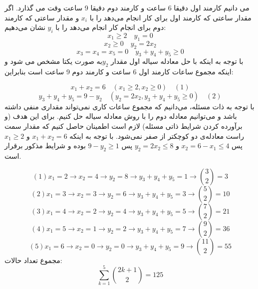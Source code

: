 \documentclass[12pt,onecolumn,a4paper]{article}
\begin{document}
می دانیم کارمند اول دقیقا 6 ساعت و کارمند دوم دقیقا 9 ساعت وقت می گذارد.
اگر مقدار ساعتی که کارمند اول برای کار  انجام می‌دهد را با $x_i$ و مقدار ساعتی که کارمند دوم برای انجام کار   انجام می‌دهد را با $y_i$  نشان می‌دهیم:
$$ x_1 \geq 2 \quad y_1 = 0 $$
$$ x_2 \geq 0 \quad y_2 = 2x_2 $$
$$ x_3=x_4=x_5=0 \quad y_3  + y_4 + y_5 \geq 0 $$
با توجه به اینکه با حل معادله سیاله اول مقدار $y_2$به صورت یکتا مشخص می شود و اینکه مجموع ساعات کارمند اول 6 ساعت و کارمند دوم 9 ساعت است بنابراین:

$$x_1 +x_2 = 6 \quad (x_1 \geq 2 , x_2 \geq  0)     \quad (1)$$
$$y_3 + y_4 + y_5 = 9-y_2 \quad (y_2 = 2x_2 , y_3 + y_4 + y_5  \geq 0) \quad (2)$$
با توجه به ذات مسئله، می‌دانیم که مجموع ساعات کاری نمی‌تواند مقداری منفی داشته باشد و می‌توانیم معادله دوم را با روش معادله سیاله حل کنیم. برای این هدف (و برآورده کردن شرایط ذاتی مسئله) لازم است اطمینان حاصل کنیم که مقدار سمت راست معادله‌ی دو کوچکتر از صفر نمی‌شود. با توجه به اینکه
$x_1 + x_2 = 6$
و
$x_1 \geq 2$
پس
$x_2 = 6 - x_1 \leq 4$
و
$y_2 = 2x_2 \leq 8$
پس
$9 - y_2 \geq 1$
بوده و شرایط مذکور برقرار است.

$$ (1) x_1 = 2\rightarrow x_2=4 \rightarrow y_2=8 \rightarrow y_3+y_4+y_5 = 1 \rightarrow \binom{3}{2} = 3$$
$$ (2) x_1 = 3\rightarrow x_2=3 \rightarrow y_2=6 \rightarrow y_3+y_4+y_5 = 3 \rightarrow \binom{5}{2} = 10$$
$$ (3) x_1 = 4\rightarrow x_2=2 \rightarrow y_2= 4\rightarrow y_3+y_4+y_5 = 5 \rightarrow \binom{7}{2} = 21$$
$$ (4) x_1 = 5\rightarrow x_2=1 \rightarrow y_2=2 \rightarrow y_3+y_4+y_5 = 7 \rightarrow \binom{9}{2} = 36 $$
$$ (5) x_1 = 6\rightarrow x_2=0 \rightarrow y_2=0 \rightarrow y_3+y_4+y_5 = 9 \rightarrow \binom{11}{2} = 55 $$
مجموع تعداد حالات: 
$$\sum_{k=1}^{5} \binom{2k+1}{2} = 125$$
\end{document}
